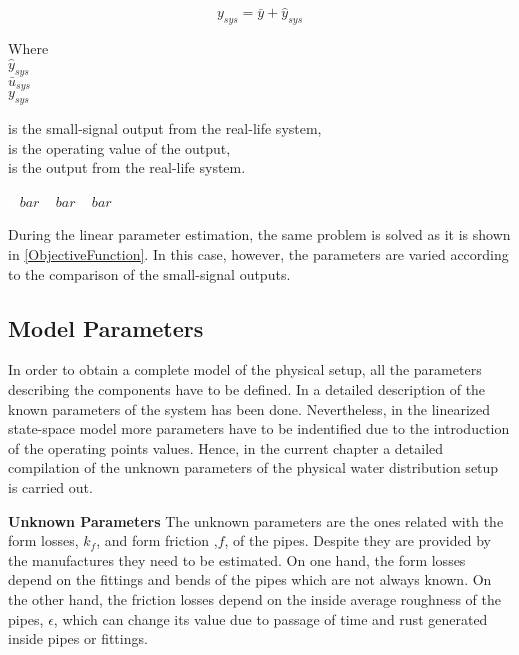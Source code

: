 \begin{equation}
  y_{sys} = \bar{y} + \hat{y}_{sys} 
 \label{u_smallsignal}
\end{equation}

\begin{minipage}[t]{0.20\textwidth}
Where\\
\hspace*{8mm} $\hat{y}_{sys}$ \\
\hspace*{8mm} $\bar{u}_{sys}$ \\
\hspace*{8mm} $y_{sys}$ 
\end{minipage}
\begin{minipage}[t]{0.68\textwidth}
\vspace*{2mm}
is the small-signal output from the real-life system, \\
is the operating value of the output,\\
is the output from the real-life system. 
\end{minipage}
\begin{minipage}[t]{0.10\textwidth}
\vspace*{2mm}
\textcolor{White}{te}$\unit{bar}$
\textcolor{White}{te}$\unit{bar}$
\textcolor{White}{te}$\unit{bar}$
\end{minipage} 

During the linear parameter estimation, the same problem is solved as it is shown in \eqref{ObjectiveFunction}. In this case, however, the parameters are varied according to the comparison of the small-signal outputs.  

\subsection{Model Parameters}
\label{estimateParameters}
In order to obtain a complete model of the physical setup, all the parameters describing the components have to be defined. In  a detailed
description of the known parameters of the system has been done. Nevertheless, in the linearized state-space model more parameters have to be indentified
due to the introduction of the operating points values. Hence, in the current chapter a detailed compilation of the unknown parameters of the physical water distribution setup is carried out.


\textbf{Unknown Parameters}
The unknown parameters are the ones related with the form losses, $k_f$, and form friction ,$f$, of the pipes. Despite they are 
provided by the manufactures they need to be estimated. On one hand, the form losses depend on the fittings and bends of the pipes which are not always known. 
On the other hand, the friction losses depend on the inside average roughness of the pipes, $\epsilon$, which can change its value due to passage of time 
and rust generated inside pipes or fittings. 

